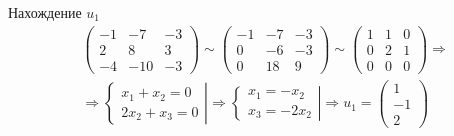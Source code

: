 \documentclass[12pt]{article}
\begin{document}
\begin{sloppypar}
    Нахождение $u_1$
    \begin{align*}
         & \begin{pmatrix}
               -1 & -7  & -3 \\
               2  & 8   & 3  \\
               -4 & -10 & -3
           \end{pmatrix}
        \sim
        \begin{pmatrix}
            -1 & -7 & -3 \\
            0  & -6 & -3 \\
            0  & 18 & 9
        \end{pmatrix}
        \sim
        \begin{pmatrix}
            1 & 1 & 0 \\
            0 & 2 & 1 \\
            0 & 0 & 0
        \end{pmatrix} \Rightarrow \\
         & \Rightarrow
        \left.\begin{cases}
                  x_1 + x_2 = 0 \\
                  2x_2 + x_3 = 0
              \end{cases}\right|
        \Rightarrow
        \left.\begin{cases}
                  x_1 = -x_2 \\
                  x_3 = -2x_2
              \end{cases}\right|
        \Rightarrow
        u_1 = \begin{pmatrix}
                  1 \\ -1 \\ 2
              \end{pmatrix}
    \end{align*}


\end{sloppypar}
\end{document}
